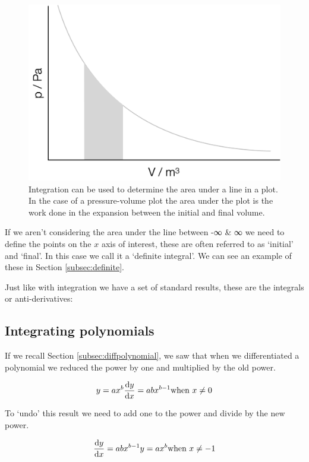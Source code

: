 \documentclass[
]{book}
\begin{document}
\begin{figure}

{\centering \includegraphics[width=0.5\linewidth]{images/integral} 

}

\caption{Integration can be used to determine the area under a line in a plot. In the case of a pressure-volume plot the area under the plot is the work done in the expansion between the initial and final volume.}\label{fig:integral}
\end{figure}

If we aren't considering the area under the line between -∞ \& ∞ we need to define the points on the \(x\) axis of interest, these are often referred to as `initial' and `final'. In this case we call it a `definite integral'. We can see an example of these in Section \ref{subsec:definite}.

Just like with integration we have a set of standard results, these are the integrals or anti-derivatives:

\hypertarget{subsec:integratingpolynomials}{%
\subsection{Integrating polynomials}\label{subsec:integratingpolynomials}}

If we recall Section \ref{subsec:diffpolynomial}, we saw that when we differentiated a polynomial we reduced the power by one and multiplied by the old power.

\begin{equation*}
y = ax^b\\
\frac{\textrm{d}y}{\textrm{d}x}=abx^{b-1}\\
\textrm{when } x \neq 0
\end{equation*}

To `undo' this result we need to add one to the power and divide by the new power.

\begin{equation*}
\frac{\textrm{d}y}{\textrm{d}x}=abx^{b-1}\\
y = ax^b\\
\textrm{when } x \neq -1
\end{equation*}
\end{document}
